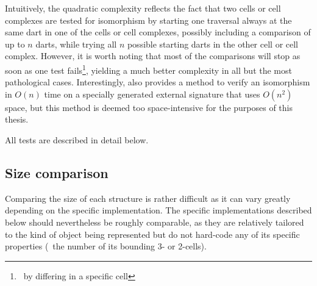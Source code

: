 Intuitively, the quadratic complexity reflects the fact that two cells or cell complexes are tested for isomorphism by starting one traversal always at the same dart in one of the cells or cell complexes, possibly including a comparison of up to $n$ darts, while trying all $n$ possible starting darts in the other cell or cell complex.
However, it is worth noting that most of the comparisons will stop as soon as one test fails\footnote{\eg\ by differing in a specific cell}, yielding a much better complexity in all but the most pathological cases.
Interestingly, \citet{Gosselin11} also provides a method to verify an isomorphism in $O(n)$ time on a specially generated external signature that uses $O(n^2)$ space, but this method is deemed too space-intensive for the purposes of this thesis.

All tests are described in detail below.

\subsection*{Size comparison}

Comparing the size of each structure is rather difficult as it can vary greatly depending on the specific implementation.
The specific implementations described below should nevertheless be roughly comparable, as they are relatively tailored to the kind of object being represented but do not hard-code any of its specific properties (\eg\ the number of its bounding 3- or 2-cells).

